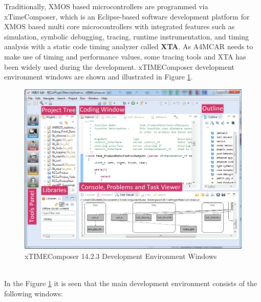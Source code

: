 Traditionally, XMOS based microcontrollers are programmed via xTimeComposer, which is an Eclipse-based software development platform for XMOS based multi core microcontrollers with integrated features such as simulation, symbolic debugging, tracing, runtime instrumentation, and timing analysis with a static code timing analyzer called \textbf{XTA}\cite{xmosflyer}. As A4MCAR needs to make use of timing and performance values, some tracing tools and XTA has been widely used during the development. xTIMEComposer development environment windows are shown and illustrated in Figure \ref{fig:xtimecomposerwindows}.
\begin{figure}[!ht]
	\includegraphics[scale=0.5]{content/images/xtimecomposerwindows.png}
	\caption{xTIMEComposer 14.2.3 Development Environment Windows}
	\label{fig:xtimecomposerwindows}
\end{figure} \\
In the Figure \ref{fig:xtimecomposerwindows} it is seen that the main development environment consists of the following windows:

